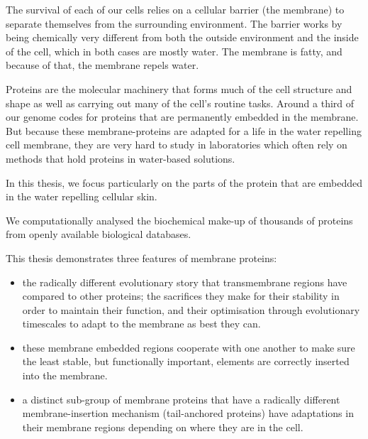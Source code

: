\documentclass[12pt,PhD,twoside]{muthesis}
\begin{document}

The survival of each of our cells relies on a cellular barrier (the membrane) to separate themselves from the surrounding environment.
The barrier works by being chemically very different from both the outside environment and the inside of the cell, which in both cases are mostly water.
The membrane is fatty, and because of that, the membrane repels water.

Proteins are the molecular machinery that forms much of the cell structure and shape as well as carrying out many of the cell's routine tasks.
Around a third of our genome codes for proteins that are permanently embedded in the membrane.
But because these membrane\--proteins are adapted for a life in the water repelling cell membrane, they are very hard to study in laboratories which often rely on methods that hold proteins in water-based solutions.

In this thesis, we focus particularly on the parts of the protein that are embedded in the water repelling cellular skin.


We computationally analysed the biochemical make\--up of thousands of proteins from openly available biological databases.

This thesis demonstrates three features of membrane proteins:
\begin{itemize}
  \item the radically different evolutionary story that transmembrane regions have compared to other proteins; the sacrifices they make for their stability in order to maintain their function, and their optimisation through evolutionary timescales to adapt to the membrane as best they can.
  \item these membrane embedded regions cooperate with one another to make sure the least stable, but functionally important, elements are correctly inserted into the membrane.
  \item a distinct sub-group of membrane proteins that have a radically different membrane-insertion mechanism (tail-anchored proteins) have adaptations in their membrane regions depending on where they are in the cell.
\end{itemize}
\end{document}
